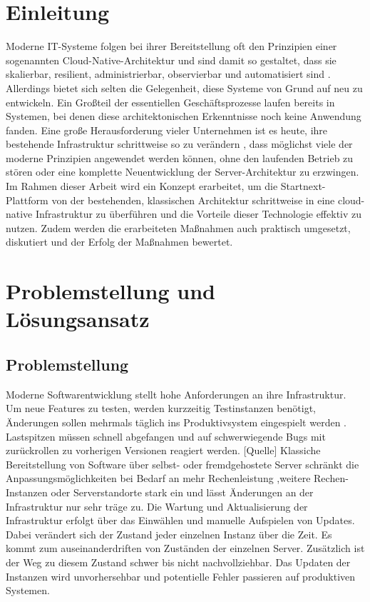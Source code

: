 \documentclass[11pt]{scrartcl}
\begin{document}
\section{Einleitung}

Moderne IT-Systeme folgen bei ihrer Bereitstellung oft den Prinzipien einer sogenannten Cloud-Native-Architektur
und sind damit so gestaltet, dass sie skalierbar, resilient, administrierbar, observierbar und automatisiert sind \cite{Lee:2021}. 
Allerdings bietet sich selten die Gelegenheit, diese Systeme von Grund auf neu zu entwickeln. Ein Großteil der essentiellen Geschäftsprozesse 
laufen bereits in Systemen, bei denen diese architektonischen Erkenntnisse noch keine Anwendung fanden. Eine große Herausforderung vieler 
Unternehmen ist es heute, ihre bestehende Infrastruktur schrittweise so zu verändern \cite{Fiedelholtz:2021}, dass möglichst viele der 
moderne Prinzipien angewendet werden können, ohne den laufenden Betrieb zu stören oder eine komplette Neuentwicklung der Server-Architektur 
zu erzwingen. Im Rahmen dieser Arbeit wird ein Konzept erarbeitet, um die Startnext-Plattform von der bestehenden, klassischen Architektur 
schrittweise in eine cloud-native Infrastruktur zu überführen und die Vorteile dieser Technologie effektiv zu nutzen. Zudem werden die erarbeiteten 
Maßnahmen auch praktisch umgesetzt, diskutiert und der Erfolg der Maßnahmen bewertet.

\section{\label{sec:problem_loesung}Problemstellung und Lösungsansatz}
\subsection{Problemstellung}
Moderne Softwarentwicklung stellt hohe Anforderungen an ihre Infrastruktur. Um neue Features zu testen, werden kurzzeitig Testinstanzen benötigt, Änderungen sollen mehrmals täglich ins Produktivsystem eingespielt werden \cite{IBM:2019}. Lastspitzen müssen schnell abgefangen und auf schwerwiegende Bugs mit zurückrollen zu vorherigen Versionen reagiert werden. [Quelle] Klassiche Bereitstellung von Software über selbst- oder fremdgehostete Server schränkt die Anpassungsmöglichkeiten bei Bedarf an mehr Rechenleistung ,weitere Rechen-Instanzen oder Serverstandorte stark ein und lässt Änderungen an der Infrastruktur nur sehr träge zu. \newline Die Wartung und Aktualisierung der Infrastruktur erfolgt über das Einwählen und manuelle Aufspielen von Updates. Dabei verändert sich der Zustand jeder einzelnen Instanz über die Zeit. Es kommt zum auseinanderdriften von Zuständen der einzelnen Server. Zusätzlich ist der Weg zu diesem Zustand schwer bis nicht nachvollziehbar. Das Updaten der Instanzen wird unvorhersehbar und potentielle Fehler passieren auf produktiven Systemen. 
\end{document}
